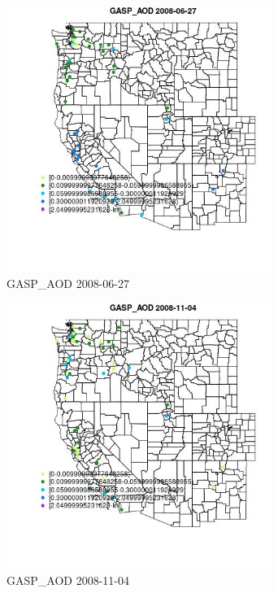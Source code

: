 \begin{figure} 
\centering  
\includegraphics[width=0.77\textwidth]{Code_Outputs/Report_ML_input_PM25_Step4_part_e_de_duplicated_aves_MapObsGASP_AOD2008-06-27.jpg} 
\caption{\label{fig:Report_ML_input_PM25_Step4_part_e_de_duplicated_avesMapObsGASP_AOD2008-06-27}GASP_AOD 2008-06-27} 
\end{figure} 
 

\clearpage 

\begin{figure} 
\centering  
\includegraphics[width=0.77\textwidth]{Code_Outputs/Report_ML_input_PM25_Step4_part_e_de_duplicated_aves_MapObsGASP_AOD2008-11-04.jpg} 
\caption{\label{fig:Report_ML_input_PM25_Step4_part_e_de_duplicated_avesMapObsGASP_AOD2008-11-04}GASP_AOD 2008-11-04} 
\end{figure} 
 

